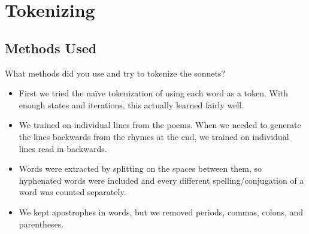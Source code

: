 \newif\ifshowsolutions
\showsolutionsfalse


\usepackage{listings}
\usepackage{caption}

\captionsetup{margin=0.5in}
\captionsetup{labelfont=bf}

\newcommand{\boldline}[1]{\underline{\textbf{#1}}}
\newcommand{\plotteddata}[3]{
  \begin{figure}[h]
  \caption{#1}
  \centering
  \texttt{[image: \#2]}
  \end{figure}
}





\pagestyle{fancy}



\section{Tokenizing}
\subsection{Methods Used}
What methods did you use and try to tokenize the sonnets?
\begin{itemize}
	\item First we tried the na\"ive tokenization of using each word as a token. With enough states and iterations, this actually learned fairly well.
  \item We trained on individual lines from the poems. When we needed to generate the lines backwards from the rhymes at the end, we trained on individual lines read in backwards.
  \item Words were extracted by splitting on the spaces between them, so hyphenated words were included and every different spelling/conjugation of a word was counted separately.
  \item We kept apostrophes in words, but we removed periods, commas, colons, and parentheses.
\end{itemize}

